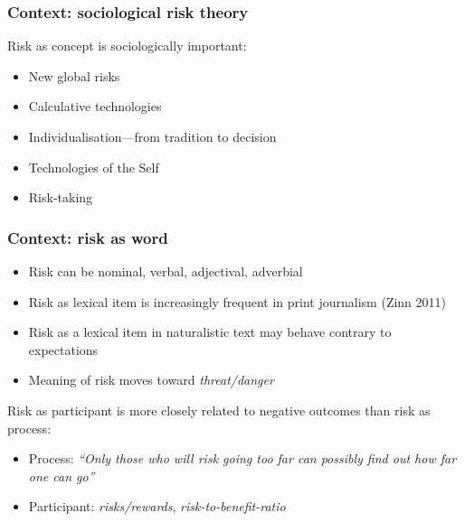 \documentclass{beamer}       %
\begin{document}
\begin{frame}
    \frametitle{Context: sociological risk theory}
    
    Risk as concept is sociologically important:

    \begin{itemize}
        \item New global risks \cite{beck_risk_1992}
        \item Calculative technologies \cite{dean_governmentality:_1999}
        \item Individualisation---from tradition to decision \cite{beck_risk_1992}
        \item Technologies of the Self \cite{dean_risk_1998}
        \item Risk-taking \cite{luhmann_risk:_1993}
    \end{itemize}

\end{frame}

\begin{frame}\frametitle{Context: risk as word}
\begin{itemize} 
    \item Risk can be nominal, verbal, adjectival, adverbial
    \item Risk as lexical item is increasingly frequent in print journalism (Zinn 2011)
    \item Risk as a lexical item in naturalistic text may behave contrary to expectations \cite{hamilton_meanings_2007}
    \item Meaning of risk moves toward \emph{threat\slash danger}
\end{itemize}
Risk as participant is more closely related to negative outcomes than risk as process:
\begin{itemize}
    \item Process: \emph{``Only those who will risk going too far can possibly find out how far one can go''}
    \item Participant: \emph{risks\slash rewards}, \emph{risk-to-benefit-ratio}
\end{itemize}
\end{frame}
\end{document}
